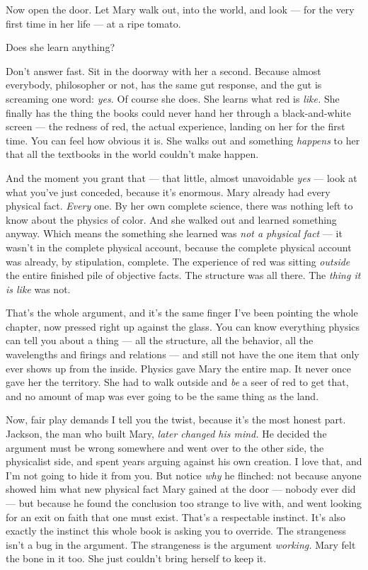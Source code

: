 \documentclass[11pt,openany]{book}
\begin{document}
Now open the door. Let Mary walk out, into the world, and look — for the very first time in her life — at a ripe tomato.

Does she learn anything?

Don’t answer fast. Sit in the doorway with her a second. Because almost everybody, philosopher or not, has the same gut response, and the gut is screaming one word: \textit{yes.} Of course she does. She learns what red is \textit{like.} She finally has the thing the books could never hand her through a black-and-white screen — the redness of red, the actual experience, landing on her for the first time. You can feel how obvious it is. She walks out and something \textit{happens} to her that all the textbooks in the world couldn’t make happen.

And the moment you grant that — that little, almost unavoidable \textit{yes} — look at what you’ve just conceded, because it’s enormous. Mary already had every physical fact. \textit{Every} one. By her own complete science, there was nothing left to know about the physics of color. And she walked out and learned something anyway. Which means the something she learned was \textit{not a physical fact} — it wasn’t in the complete physical account, because the complete physical account was already, by stipulation, complete. The experience of red was sitting \textit{outside} the entire finished pile of objective facts. The structure was all there. The \textit{thing it is like} was not.

That’s the whole argument, and it’s the same finger I’ve been pointing the whole chapter, now pressed right up against the glass. You can know everything physics can tell you about a thing — all the structure, all the behavior, all the wavelengths and firings and relations — and still not have the one item that only ever shows up from the inside. Physics gave Mary the entire map. It never once gave her the territory. She had to walk outside and \textit{be} a seer of red to get that, and no amount of map was ever going to be the same thing as the land.

Now, fair play demands I tell you the twist, because it’s the most honest part. Jackson, the man who built Mary, \textit{later changed his mind.} He decided the argument must be wrong somewhere and went over to the other side, the physicalist side, and spent years arguing against his own creation. I love that, and I’m not going to hide it from you. But notice \textit{why} he flinched: not because anyone showed him what new physical fact Mary gained at the door — nobody ever did — but because he found the conclusion too strange to live with, and went looking for an exit on faith that one must exist. That’s a respectable instinct. It’s also exactly the instinct this whole book is asking you to override. The strangeness isn’t a bug in the argument. The strangeness is the argument \textit{working.} Mary felt the bone in it too. She just couldn’t bring herself to keep it.
\end{document}
